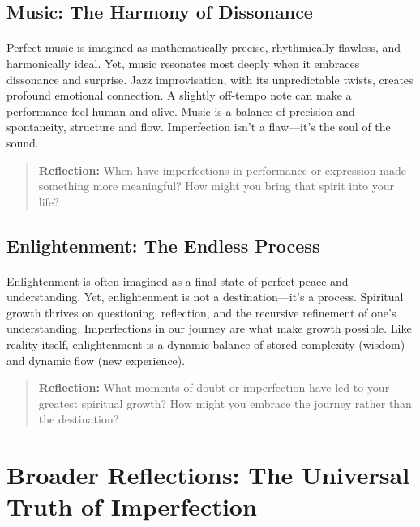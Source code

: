 \documentclass[12pt]{article}
\begin{document}
\subsection{Music: The Harmony of Dissonance}
\paragraph{}
Perfect music is imagined as mathematically precise, rhythmically flawless, and harmonically ideal. Yet, music resonates most deeply when it embraces dissonance and surprise. Jazz improvisation, with its unpredictable twists, creates profound emotional connection. A slightly off-tempo note can make a performance feel human and alive. Music is a balance of precision and spontaneity, structure and flow. Imperfection isn’t a flaw—it’s the soul of the sound.

\begin{quote}
\textbf{Reflection:}  
When have imperfections in performance or expression made something more meaningful? How might you bring that spirit into your life?
\end{quote}

\subsection{Enlightenment: The Endless Process}
\paragraph{}
Enlightenment is often imagined as a final state of perfect peace and understanding. Yet, enlightenment is not a destination—it’s a process. Spiritual growth thrives on questioning, reflection, and the recursive refinement of one’s understanding. Imperfections in our journey are what make growth possible. Like reality itself, enlightenment is a dynamic balance of stored complexity (wisdom) and dynamic flow (new experience).

\begin{quote}
\textbf{Reflection:}  
What moments of doubt or imperfection have led to your greatest spiritual growth? How might you embrace the journey rather than the destination?
\end{quote}

\section*{Broader Reflections: The Universal Truth of Imperfection}
\end{document}
